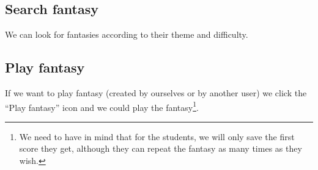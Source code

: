 \subsection{Search fantasy}
We can look for fantasies according to their theme and difficulty.

\subsection{Play fantasy}
If we want to play fantasy (created by ourselves or by another user) we click the ``Play fantasy'' icon and we could play the fantasy\footnote{We need to have in mind that for the students, we will only save the first score they get, although they can repeat the fantasy as many times as they wish.}.